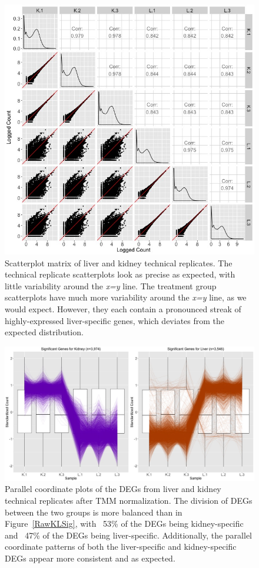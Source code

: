 \documentclass{article}
\begin{document}
\begin{figure}[!p]
\centerline{\includegraphics[width=1\columnwidth]{../Bioinformatics/Pictures/liverKidney/DEG-raw/K_L_SM.jpg}}
\caption{Scatterplot matrix of liver and kidney technical replicates. The technical replicate scatterplots look as precise as expected, with little variability around the \textit{x=y} line. The treatment group scatterplots have much more variability around the \textit{x=y} line, as we would expect. However, they each contain a pronounced streak of highly-expressed liver-specific genes, which deviates from the expected distribution. 
\label{KLSM}}
\end{figure} 

\begin{figure}[!p]
\centerline{\includegraphics[width=1\columnwidth]{../Bioinformatics/Pictures/liverKidney/Clustering_data_FDR_001_TMM/Alpha0.1/K_L_Sig.jpg}}
\caption{Parallel coordinate plots of the DEGs from liver and kidney technical replicates after TMM normalization. The division of DEGs between the two groups is more balanced than in Figure~\ref{RawKLSig}, with ~53\% of the DEGs being kidney-specific and ~47\% of the DEGs being liver-specific. Additionally, the parallel coordinate patterns of both the liver-specific and kidney-specific DEGs appear more consistent and as expected.
\label{TMMKLSig}}
\end{figure} 
\end{document}
